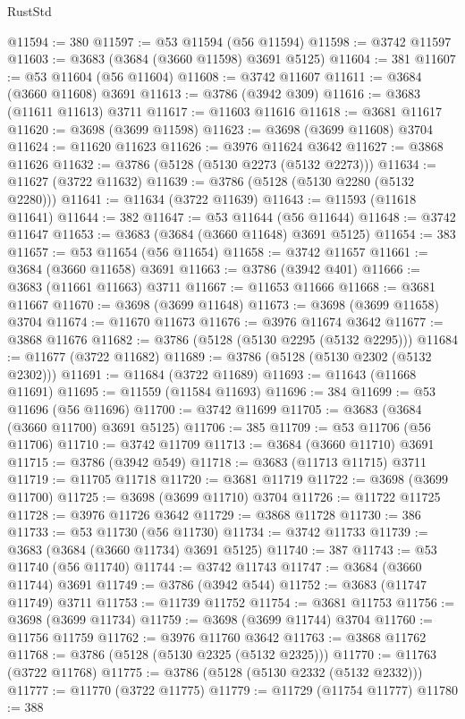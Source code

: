 \begin{lexlean}{RustStd}
\begin{coremodule}
{\begin{coremodule}
{{{{{{{{{{{{{{{{{{{{{{{{{{{{{{{{{{{{{{{{{{{{{{{@11594 := 380
@11597 := @53 @11594 (@56 @11594)
@11598 := @3742 @11597
@11603 := @3683 (@3684 (@3660 @11598) @3691 @5125)
@11604 := 381
@11607 := @53 @11604 (@56 @11604)
@11608 := @3742 @11607
@11611 := @3684 (@3660 @11608) @3691
@11613 := @3786 (@3942 @309)
@11616 := @3683 (@11611 @11613) @3711
@11617 := @11603 @11616
@11618 := @3681 @11617
@11620 := @3698 (@3699 @11598)
@11623 := @3698 (@3699 @11608) @3704
@11624 := @11620 @11623
@11626 := @3976 @11624 @3642
@11627 := @3868 @11626
@11632 := @3786 (@5128 (@5130 @2273 (@5132 @2273)))
@11634 := @11627 (@3722 @11632)
@11639 := @3786 (@5128 (@5130 @2280 (@5132 @2280)))
@11641 := @11634 (@3722 @11639)
@11643 := @11593 (@11618 @11641)
@11644 := 382
@11647 := @53 @11644 (@56 @11644)
@11648 := @3742 @11647
@11653 := @3683 (@3684 (@3660 @11648) @3691 @5125)
@11654 := 383
@11657 := @53 @11654 (@56 @11654)
@11658 := @3742 @11657
@11661 := @3684 (@3660 @11658) @3691
@11663 := @3786 (@3942 @401)
@11666 := @3683 (@11661 @11663) @3711
@11667 := @11653 @11666
@11668 := @3681 @11667
@11670 := @3698 (@3699 @11648)
@11673 := @3698 (@3699 @11658) @3704
@11674 := @11670 @11673
@11676 := @3976 @11674 @3642
@11677 := @3868 @11676
@11682 := @3786 (@5128 (@5130 @2295 (@5132 @2295)))
@11684 := @11677 (@3722 @11682)
@11689 := @3786 (@5128 (@5130 @2302 (@5132 @2302)))
@11691 := @11684 (@3722 @11689)
@11693 := @11643 (@11668 @11691)
@11695 := @11559 (@11584 @11693)
@11696 := 384
@11699 := @53 @11696 (@56 @11696)
@11700 := @3742 @11699
@11705 := @3683 (@3684 (@3660 @11700) @3691 @5125)
@11706 := 385
@11709 := @53 @11706 (@56 @11706)
@11710 := @3742 @11709
@11713 := @3684 (@3660 @11710) @3691
@11715 := @3786 (@3942 @549)
@11718 := @3683 (@11713 @11715) @3711
@11719 := @11705 @11718
@11720 := @3681 @11719
@11722 := @3698 (@3699 @11700)
@11725 := @3698 (@3699 @11710) @3704
@11726 := @11722 @11725
@11728 := @3976 @11726 @3642
@11729 := @3868 @11728
@11730 := 386
@11733 := @53 @11730 (@56 @11730)
@11734 := @3742 @11733
@11739 := @3683 (@3684 (@3660 @11734) @3691 @5125)
@11740 := 387
@11743 := @53 @11740 (@56 @11740)
@11744 := @3742 @11743
@11747 := @3684 (@3660 @11744) @3691
@11749 := @3786 (@3942 @544)
@11752 := @3683 (@11747 @11749) @3711
@11753 := @11739 @11752
@11754 := @3681 @11753
@11756 := @3698 (@3699 @11734)
@11759 := @3698 (@3699 @11744) @3704
@11760 := @11756 @11759
@11762 := @3976 @11760 @3642
@11763 := @3868 @11762
@11768 := @3786 (@5128 (@5130 @2325 (@5132 @2325)))
@11770 := @11763 (@3722 @11768)
@11775 := @3786 (@5128 (@5130 @2332 (@5132 @2332)))
@11777 := @11770 (@3722 @11775)
@11779 := @11729 (@11754 @11777)
@11780 := 388
}}}}}}}}}}}}}}}}}}}}}}}}}}}}}}}}}}}}}}}}}}}}}}}
\end{coremodule}}
\end{coremodule}
\end{lexlean}
